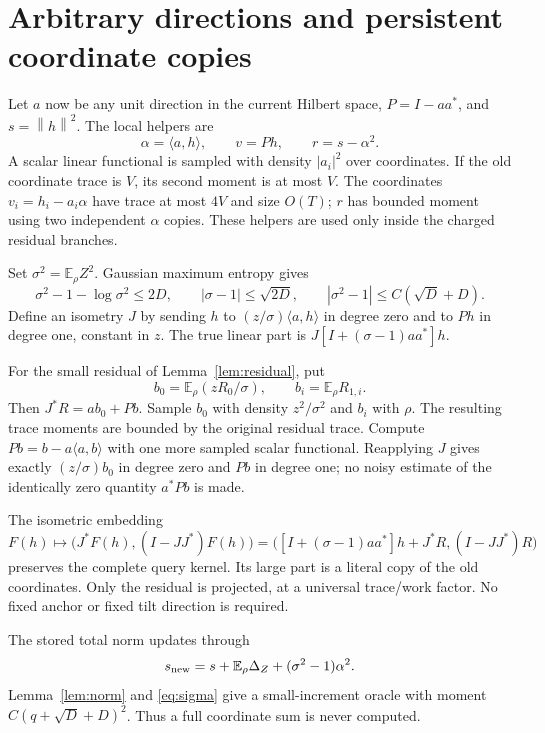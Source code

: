 \documentclass[11pt]{article}
\newcommand{\E}{\mathbb E}
\newcommand{\norm}[1]{\left\lVert #1\right\rVert}
\begin{document}
\section{Arbitrary directions and persistent coordinate copies}
Let $a$ now be any unit direction in the current Hilbert space, $P=I-aa^*$, and $s=\norm h^2$. The local helpers are
\[
 \alpha=\langle a,h\rangle,\qquad v=Ph,\qquad r=s-\alpha^2.
\]
A scalar linear functional is sampled with density $|a_i|^2$ over coordinates. If the old coordinate trace is $V$, its second moment is at most $V$. The coordinates $v_i=h_i-a_i\alpha$ have trace at most $4V$ and size $O(T)$; $r$ has bounded moment using two independent $\alpha$ copies. These helpers are used only inside the charged residual branches.

Set $\sigma^2=\E_\rho Z^2$. Gaussian maximum entropy gives
\begin{equation}
 \sigma^2-1-\log\sigma^2\le2D,\qquad
 |\sigma-1|\le\sqrt{2D},\qquad
 |\sigma^2-1|\le C(\sqrt D+D).
 \label{eq:sigma}
\end{equation}
Define an isometry $J$ by sending $h$ to $(z/\sigma)\langle a,h\rangle$ in degree zero and to $Ph$ in degree one, constant in $z$. The true linear part is $J[I+(\sigma-1)aa^*]h$.

For the small residual of Lemma~\ref{lem:residual}, put
\[
 b_0=\E_\rho(zR_0/\sigma),\qquad b_i=\E_\rho R_{1,i}.
\]
Then $J^*R=ab_0+Pb$. Sample $b_0$ with density $z^2/\sigma^2$ and $b_i$ with $\rho$. The resulting trace moments are bounded by the original residual trace. Compute $Pb=b-a\langle a,b\rangle$ with one more sampled scalar functional. Reapplying $J$ gives exactly $(z/\sigma)b_0$ in degree zero and $Pb$ in degree one; no noisy estimate of the identically zero quantity $a^*Pb$ is made.

The isometric embedding
\begin{equation}
 F(h)\longmapsto\bigl(J^*F(h),(I-JJ^*)F(h)\bigr)
 =\bigl([I+(\sigma-1)aa^*]h+J^*R,(I-JJ^*)R\bigr)
 \label{eq:embedding}
\end{equation}
preserves the complete query kernel. Its large part is a literal copy of the old coordinates. Only the residual is projected, at a universal trace/work factor. No fixed anchor or fixed tilt direction is required.

The stored total norm updates through
\[
 s_{\rm new}=s+\E_\rho\Delta_Z+(\sigma^2-1)\alpha^2.
\]
Lemma~\ref{lem:norm} and \eqref{eq:sigma} give a small-increment oracle with moment $C(q+\sqrt D+D)^2$. Thus a full coordinate sum is never computed.
\end{document}

